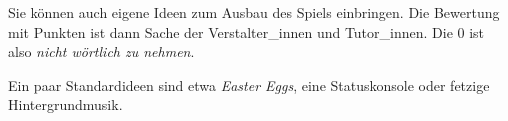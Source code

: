 Sie k\"onnen auch eigene Ideen zum Ausbau des Spiels einbringen. Die
Bewertung mit Punkten ist dann Sache der Verstalter\_innen und 
Tutor\_innen. Die 0 ist also \emph{nicht w\"ortlich zu nehmen}.

Ein paar \glqq{}Standardideen\grqq{} sind etwa \emph{Easter Eggs}, eine
Statuskonsole oder fetzige Hintergrundmusik.